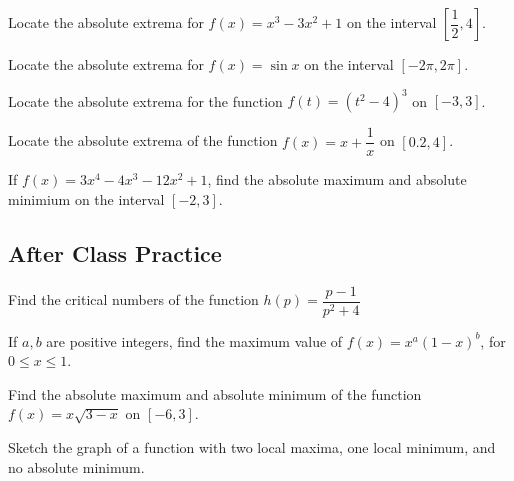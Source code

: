 \documentclass[notes]{subfiles}
\begin{document}
		\begin{ex}
			Locate the absolute extrema for \(f(x) = x^3 -3x^2+1\) on the interval \(\left[\dfrac{1}{2},4\right]\).
		\end{ex}
			
		\begin{ex}
			Locate the absolute extrema for \(f(x) = \sin x\) on the interval \([-2\pi,2\pi]\).
		\end{ex}
			\newpage
			
		\begin{ex}
			Locate the absolute extrema for the function \(f(t) = (t^2-4)^3\) on \([-3,3]\).
		\end{ex}
			
		\begin{ex}
			Locate the absolute extrema of the function \(f(x) = x + \dfrac{1}{x}\) on \([0.2,4]\).
		\end{ex}
			
		\begin{ex}
			If \(f(x) = 3x^4 - 4x^3 - 12x^2 + 1\), find the absolute maximum and absolute minimium on the interval \([-2,3]\).
		\end{ex}
			\newpage
			
	\subsection*{After Class Practice}
		\begin{ex}
			Find the critical numbers of the function \(h(p) =\dfrac{p-1}{p^2+4}\)
		\end{ex}
		\begin{ex}
			If \(a,b\) are positive integers, find the maximum value of \(f(x) = x^a(1-x)^b\), for \(0\leq x\leq 1\).
		\end{ex}
			\newpage
			
		\begin{ex}
			Find the absolute maximum and absolute minimum of the function \(f(x) = x\sqrt{3-x}\) on \([-6,3]\).
		\end{ex}	
			
		\begin{ex}
			Sketch the graph of a function with two local maxima, one local minimum, and no absolute minimum.
		\end{ex}

\clearpage
\end{document}
